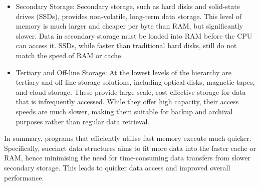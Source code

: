 \begin{itemize}
    \item Secondary Storage: Secondary storage, such as hard disks and solid-state drives (SSDs), provides non-volatile, long-term data storage. This level of memory is much larger and cheaper per byte than RAM, but significantly slower. Data in secondary storage must be loaded into RAM before the CPU can access it. SSDs, while faster than traditional hard disks, still do not match the speed of RAM or cache.
    \item Tertiary and Off-line Storage: At the lowest levels of the hierarchy are tertiary and off-line storage solutions, including optical disks, magnetic tapes, and cloud storage. These provide large-scale, cost-effective storage for data that is infrequently accessed. While they offer high capacity, their access speeds are much slower, making them suitable for backup and archival purposes rather than regular data retrieval.
\end{itemize}
In summary, programs that efficiently utilise fast memory execute much quicker. Specifically, succinct data structures aims to fit more data into the faster cache or RAM, hence minimising the need for time-consuming data transfers from slower secondary storage. This leads to quicker data access and improved overall performance.

